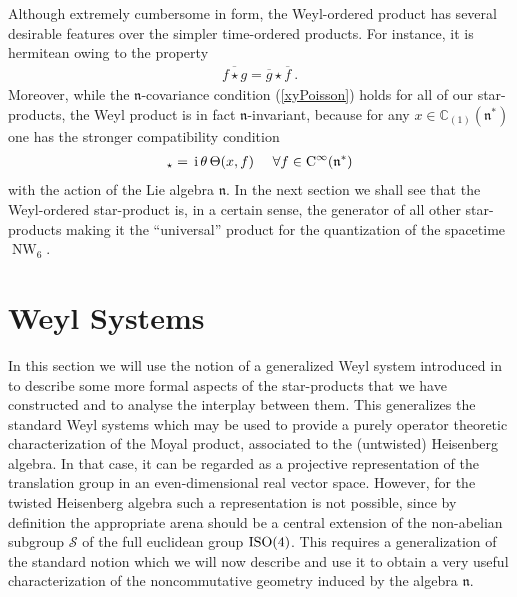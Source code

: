 \documentclass[11pt,a4paper]{article}
\DeclareMathOperator{\NW}{NW}
\def\ii{{\,{\rm i}\,}}
\def\CC{{\rm C}}
\def\mfn{{\mathfrak n}}
\newcommand{\newsection}{\setcounter{equation}{0}\section}
\newcommand{\complex}{{\mathbb C}} %
\newcommand{\beq}{\begin{eqnarray}}
\newcommand{\eeq}{\end{eqnarray}}
\begin{document}
Although extremely cumbersome in form, the Weyl-ordered product has
several desirable features over the simpler time-ordered products. For
instance, it is hermitean owing to the property
\beq
\overline{f\star g}=\overline{g}\star\overline{f} \ .
\label{Weylstarherm}\eeq
Moreover, while the $\mfn$-covariance condition (\ref{xyPoisson})
holds for all of our star-products, the Weyl product is in fact
$\mfn$-invariant, because for any $x\in\complex_{(1)}(\mfn^*)$ one
has the stronger compatibility condition
\beq
[x,f]_\star=\ii\theta\,\Theta(x,f) ~~~~ \forall f\in\CC^\infty(\mfn^*)
\label{strongcompcond}\eeq
with the action of the Lie algebra $\mfn$. In the next
section we shall see that the Weyl-ordered star-product is, in a
certain sense, the generator of all other star-products making it the
``universal'' product for the quantization of the spacetime $\NW_6$.

\newsection{Weyl Systems\label{WeylSystems}}

In this section we will use the notion of a generalized Weyl system
introduced in~\cite{ALZ1} to describe some more formal aspects of the
star-products that we have constructed and to analyse the interplay
between them. This generalizes the standard Weyl systems which may be
used to provide a purely operator theoretic characterization of the
Moyal product, associated to the (untwisted) Heisenberg algebra. In
that case, it can be regarded as a projective representation of the
translation group in an even-dimensional real vector space. However,
for the twisted Heisenberg algebra such a representation is not
possible, since by definition the appropriate arena should be a
central extension of the non-abelian subgroup $\mathcal S$ of
the full euclidean group ${\rm ISO}(4)$. This requires a
generalization of the standard notion which we will now describe and
use it to obtain a very useful characterization of the noncommutative
geometry induced by the algebra $\mfn$.
\end{document}
